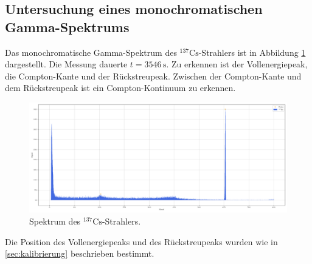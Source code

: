 \subsection{Untersuchung eines monochromatischen Gamma-Spektrums}
Das monochromatische Gamma-Spektrum des $^{137}\text{Cs}$-Strahlers ist in Abbildung \ref{fig:cs} dargestellt.
Die Messung dauerte $t = 3546 \, \si{\second}$.
Zu erkennen ist der Vollenergiepeak, die Compton-Kante und der Rückstreupeak. 
Zwischen der Compton-Kante und dem Rückstreupeak ist ein Compton-Kontinuum zu erkennen.

\begin{figure}[H]
  \centering
  \includegraphics[width=\textwidth]{../plots/Caesium-Peaks.pdf}
  \caption{Spektrum des $^{137}\text{Cs}$-Strahlers.}
  \label{fig:cs}
\end{figure}

Die Position des Vollenergiepeaks und des Rückstreupeaks wurden wie in \ref{sec:kalibrierung} beschrieben bestimmt.

